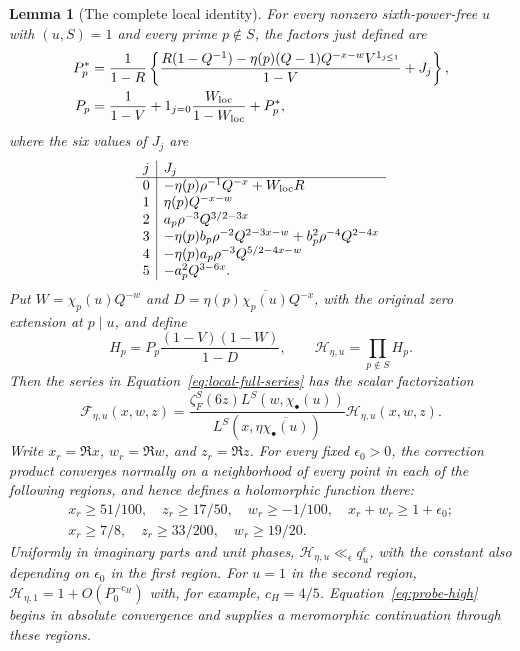 \documentclass[11pt,a4paper]{article}
\numberwithin{equation}{section}
\numberwithin{figure}{section}
\newtheorem{lemma}[theorem]{Lemma}
\theoremstyle{definition}
\theoremstyle{remark}
\begin{document}
\begin{lemma}[The complete local identity]\label{lem:local-euler}
For every nonzero sixth-power-free $u$ with $(u,S)=1$ and every
prime $p\notin S$, the factors just defined are
\begin{equation}\label{old-eq:5.13a}
\begin{aligned}
 P_p^*&=\frac1{1-R}\left\{
 \frac{R(1-Q^{-1})-\eta(p)(Q-1)
 Q^{-x-w}V^{1_{j\le1}}}{1-V}+J_j\right\},\\
 P_p&=\frac1{1-V}+1_{j=0}\frac{W_{\rm loc}}{1-W_{\rm loc}}+P_p^*,
\end{aligned}
\end{equation}
where the six values of $J_j$ are
\[
\begin{array}{c|l}
 j&J_j\\\hline
 0&-\eta(p)\rho^{-1}Q^{-x}+W_{\rm loc}R\\
 1&\eta(p)Q^{-x-w}\\
 2&a_p\rho^{-3}Q^{3/2-3x}\\
 3&-\eta(p)b_p\rho^{-2}Q^{2-3x-w}
       +b_p^2\rho^{-4}Q^{2-4x}\\
 4&-\eta(p)a_p\rho^{-3}Q^{5/2-4x-w}\\
 5&-a_p^2Q^{3-6x}.
\end{array}
\]
Put $W=\chi_p(u)Q^{-w}$ and
$D=\eta(p)\overline{\chi_p(u)}Q^{-x}$, with the original zero
extension at $p\mid u$, and define
\begin{equation}\label{eq:local-H-definition}
 H_p=P_p\frac{(1-V)(1-W)}{1-D},\qquad
 \mathcal H_{\eta,u}=\prod_{p\notin S}H_p.
\end{equation}
Then the series in Equation~\eqref{eq:local-full-series} has the
scalar factorization
\begin{equation}\label{eq:probe-high}
 \mathcal F_{\eta,u}(x,w,z)=
 \frac{\zeta_F^S(6z)L^S(w,\chi_\bullet(u))}
 {L^S(x,\eta\overline{\chi_\bullet(u)})}
 \mathcal H_{\eta,u}(x,w,z).
\end{equation}
Write $x_r=\Re x$, $w_r=\Re w$, and $z_r=\Re z$.  For every
fixed $\epsilon_0>0$, the correction product converges normally
on a neighborhood of every point in each of the following regions,
and hence defines a holomorphic function there:
\begin{align}
 x_r\ge51/100,\quad z_r\ge17/50,\quad w_r\ge-1/100,\quad
 x_r+w_r\ge1+\epsilon_0;\label{eq:local-region-one}\\
 x_r\ge7/8,\quad z_r\ge33/200,\quad w_r\ge19/20.
 \label{eq:local-region-two}
\end{align}
Uniformly in imaginary parts and unit phases,
$\mathcal H_{\eta,u}\ll_\epsilon q_u^\epsilon$, with the constant
also depending on $\epsilon_0$ in the first region.  For $u=1$ in the
second region,
$\mathcal H_{\eta,1}=1+O(P_0^{-c_H})$ with, for example,
$c_H=4/5$.  Equation~\eqref{eq:probe-high} begins in absolute
convergence and supplies a meromorphic continuation through these
regions.
\end{lemma}
\end{document}
